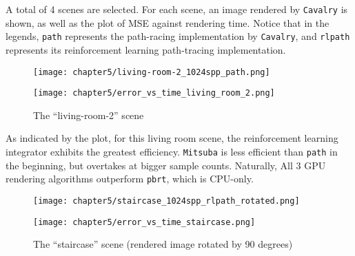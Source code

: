 A total of 4 scenes are selected. For each scene, an image rendered by \texttt{Cavalry} is shown, as well as the plot of MSE against rendering time. Notice that in the legends, \texttt{path} represents the path-racing implementation by \texttt{Cavalry}, and \texttt{rlpath} represents its reinforcement learning path-tracing implementation.

\begin{figure}[H]
    \centering
    
    \begin{minipage}[t]{.99\textwidth}
        \centering
        \vspace{0pt}
        \texttt{[image: chapter5/living-room-2\_1024spp\_path.png]}
    \end{minipage}
    
    \vspace{0.1cm}

    \begin{minipage}[t]{.99\textwidth}
        \centering
        \vspace{0pt}
        \texttt{[image: chapter5/error\_vs\_time\_living\_room\_2.png]}
    \end{minipage}
    
    \caption{The ``living-room-2'' scene}
\end{figure}

As indicated by the plot, for this living room scene, the reinforcement learning integrator exhibits the greatest efficiency. \texttt{Mitsuba} is less efficient than \texttt{path} in the beginning, but overtakes at bigger sample counts. Naturally, All 3 GPU rendering algorithms outperform \texttt{pbrt}, which is CPU-only.

\newpage

\begin{figure}[H]
    \centering
    
    \begin{minipage}[t]{.99\textwidth}
        \centering
        \vspace{0pt}
        \texttt{[image: chapter5/staircase\_1024spp\_rlpath\_rotated.png]}
    \end{minipage}
    
    \vspace{0.3cm}

    \begin{minipage}[t]{.99\textwidth}
        \centering
        \vspace{0pt}
        \texttt{[image: chapter5/error\_vs\_time\_staircase.png]}
    \end{minipage}
    
    \caption{The ``staircase'' scene (rendered image rotated by 90 degrees)}
\end{figure}

